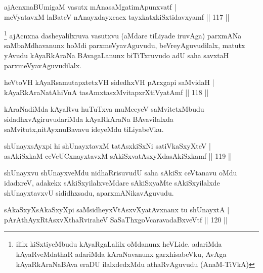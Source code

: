 \begin{shl}
ajAcnxnaBUmigaM vasutx mAnasaMgatimApunxvatf |\\
meVyatavxM laBateV nAnayxdayxcacx tayxkatxkiSxtidavxyamf \hfill || 117 ||
\end{shl}

\begin{artha}
\footnote{ililx kiSxtiyeMbudu kAyaRgaLalilx oMdanunx heVLide. adariMda kAyaRveMdathaR adariMda kAraNavanunx garxhisabeVku, AvAga kAyaRkAraNaBAva eraDU ilalxdedxMdu athaRvAguvudu (AnaM-TiVkA)}
ajAcnxna dasheyalilxruva vasutxvu (aMdare tiLiyade iruvAga) parxmANa saMbaMdhavanunx hoMdi parxmeVyavAguvudu, beVreyAguvudilalx, matutx yAvudu kAyaRkAraNa BAvagaLanunx biTiTxruvudo adU saha savxtaH parxmeVyavAguvudilalx.
\end{artha}


\begin{shl}
heVtoVH kAyaRsamutapxtetxVH sidedhxVH pArxgapi saMvidaH |\\
kAyaRkAraNatAhiVnA tasAmxtasxMvitapxrXtiVyatAmf \hfill || 118 ||
\end{shl}

\begin{artha}%
kAraNadiMda kAyaRvu huTuTxva muMceyeV saMvitetxMbudu sidadhxvAgiruvudariMda kAyaRkAraNa BAvavilalxda saMvitutx,\break nitAyxnuBavavu ideyeMdu tiLiyabeVku.
\end{artha}


\begin{shl}
shUnayxsAyxpi hi shUnayxtavxM tatAsxkiSxNi satiVkaSxyXteV |\\
asAkiSxkaM ceVcUCxnayxtavxM sAkiSxvatAsxyXdasAkiSxkamf \hfill || 119 ||
\end{shl}

\begin{artha}
shUnayxvu shUnayxveMdu nidhaRrisuvudU saha sAkiSx ceVtanavu oMdu idadxreV, adakekx sAkiSxyilalxveMdare sAkiSxyaMte sAkiSxyilalxde shUnayxtavxvU sididhxsadu, aparxmANikavAguvudu.
\end{artha}

\begin{shl}
sAkaSxyXsAkaSxyXpi saMsidheyxVtAsxvXyatAvxnanx tu shUnayxtA |\\
pArAthAyxRtAsxvXthaRviraheV SaSaThxgoVcaravadaBxveVtf \hfill || 120 ||
\end{shl}

